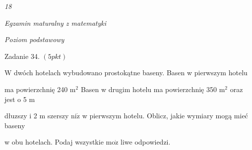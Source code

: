 \documentclass[a4paper,12pt]{article}
\begin{document}
{\it 18}

{\it Egzamin maturalny z matematyki}

{\it Poziom podstawowy}

Zadanie 34. $(5pkt)$

$\mathrm{W}$ dwóch hotelach wybudowano prostokątne baseny. Basen w pierwszym hotelu

ma powierzchnię 240 $\mathrm{m}^{2}$ Basen w drugim hotelu ma powierzchnię 350 $\mathrm{m}^{2}$ oraz jest o 5 $\mathrm{m}$

dłuzszy i 2 $\mathrm{m}$ szerszy $\mathrm{n}\mathrm{i}\dot{\mathrm{z}}$ w pierwszym hotelu. Oblicz, jakie wymiary mogą mieć baseny

w obu hotelach. Podaj wszystkie $\mathrm{m}\mathrm{o}\dot{\mathrm{z}}$ liwe odpowiedzi.
\end{document}
